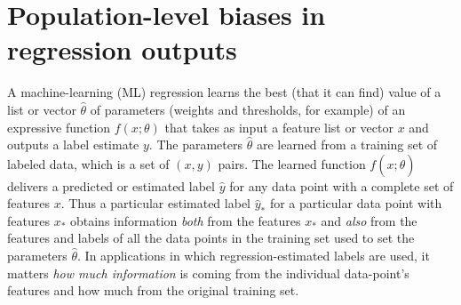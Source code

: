 \documentclass[10pt]{article}
\begin{document}
\section{Population-level biases in regression outputs}\label{app:toy}
A machine-learning (ML) regression learns the best (that it can find) value of a list or vector $\hat{\theta}$ of parameters (weights and thresholds, for example) of an expressive function $f(x;\theta)$ that takes as input a feature list or vector $x$ and outputs a label estimate $y$.
The parameters $\hat{\theta}$ are learned from a training set of labeled data, which is a set of $(x, y)$ pairs.
The learned function $f(x;\hat{\theta})$ delivers a predicted or estimated label $\hat{y}$ for any data point with a complete set of features $x$.
Thus a particular estimated label $\hat{y}_\ast$ for a particular data point with features $x_\ast$ obtains information \emph{both} from the features $x_\ast$ and \emph{also} from the features and labels of all the data points in the training set used to set the parameters $\hat{\theta}$.
In applications in which regression-estimated labels are used, it matters \emph{how much information} is coming from the individual data-point's features and how much from the original training set.
\end{document}
